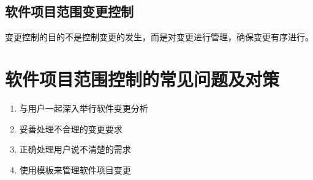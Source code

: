 \subsection{软件项目范围变更控制}
变更控制的目的不是控制变更的发生，而是对变更进行管理，确保变更有序进行。
\section{软件项目范围控制的常见问题及对策}
\begin{enumerate}
	\item 与用户一起深入举行软件变更分析
	\item 妥善处理不合理的变更要求
	\item 正确处理用户说不清楚的需求
	\item 使用模板来管理软件项目变更
\end{enumerate}